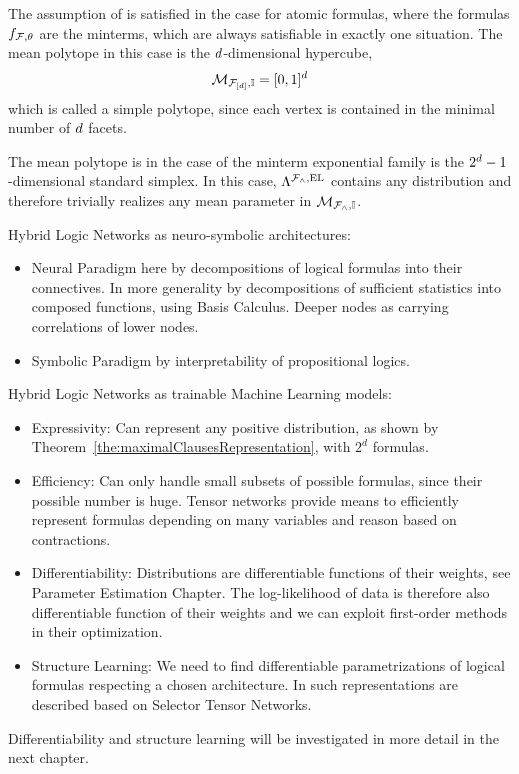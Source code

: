 \begin{example}
    The assumption of  is satisfied in the case for atomic formulas, where the formulas  $f_{\mathcal{F},\theta}$ are the minterms, which are always satisfiable in exactly one situation.
    The mean polytope in this case is the $d$-dimensional hypercube,
    \[ \mathcal{M}_{\mathcal{F}_{[d]},\mathbb{I}} = [0,1]^{d} \]
    which is called a simple polytope, since each vertex is contained in the minimal number of $d$ facets.
\end{example}

\begin{example}
    The mean polytope is in the case of the minterm exponential family is the $2^d-1$-dimensional standard simplex.
    In this case, $\Lambda^{\mathcal{F}_{\land},\mathrm{EL}}$ contains any distribution and therefore trivially realizes any mean parameter in $\mathcal{M}_{\mathcal{F}_{\land},\mathbb{I}}$.
\end{example}





Hybrid Logic Networks as neuro-symbolic architectures:
\begin{itemize}
    \item Neural Paradigm here by decompositions of logical formulas into their connectives.
    In more generality by decompositions of sufficient statistics into composed functions, using Basis Calculus.
    Deeper nodes as carrying correlations of lower nodes.
    \item Symbolic Paradigm by interpretability of propositional logics.
\end{itemize}


Hybrid Logic Networks as trainable Machine Learning models:
\begin{itemize}
    \item Expressivity: Can represent any positive distribution, as shown by Theorem~\ref{the:maximalClausesRepresentation}, with $2^d$ formulas.
    \item Efficiency: Can only handle small subsets of possible formulas, since their possible number is huge.
    Tensor networks provide means to efficiently represent formulas depending on many variables and reason based on contractions.
    \item Differentiability: Distributions are differentiable functions of their weights, see Parameter Estimation Chapter.
    The log-likelihood of data is therefore also differentiable function of their weights and we can exploit first-order methods in their optimization.
    \item Structure Learning: We need to find differentiable parametrizations of logical formulas respecting a chosen architecture.
    In  such representations are described based on Selector Tensor Networks.
\end{itemize}
Differentiability and structure learning will be investigated in more detail in the next chapter.

